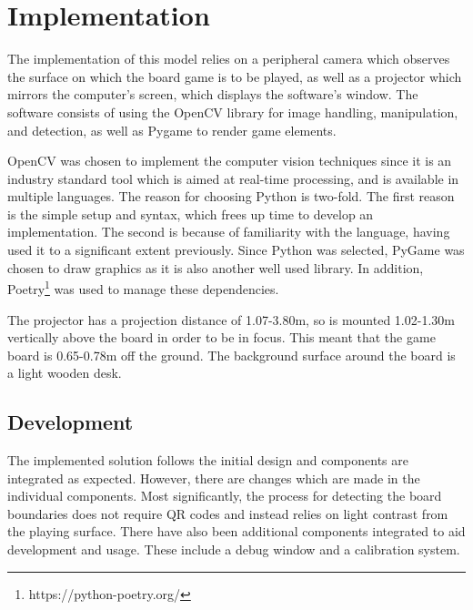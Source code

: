 \documentclass[12pt]{article}
\begin{document}





\section{Implementation}
The implementation of this model relies on a peripheral camera which observes the surface on which the board game is to be played, as well as a projector which mirrors the computer's screen, which displays the software's window. 
The software consists of using the OpenCV library for image handling, manipulation, and detection, as well as Pygame to render game elements. 

OpenCV was chosen to implement the computer vision techniques since it is an industry standard tool which is aimed at real-time processing, and is available in multiple languages. 
The reason for choosing Python is two-fold. 
The first reason is the simple setup and syntax, which frees up time to develop an implementation. 
The second is because of familiarity with the language, having used it to a significant extent previously. 
Since Python was selected, PyGame was chosen to draw graphics as it is also another well used library. 
In addition, Poetry\footnote{https://python-poetry.org/} was used to manage these dependencies. 

The projector has a projection distance of 1.07-3.80m, so is mounted 1.02-1.30m vertically above the board in order to be in focus. 
This meant that the game board is 0.65-0.78m off the ground. 
The background surface around the board is a light wooden desk. 

\subsection{Development}
The implemented solution follows the initial design and components are integrated as expected. 
However, there are changes which are made in the individual components. 
Most significantly, the process for detecting the board boundaries does not require QR codes and instead relies on light contrast from the playing surface. 
There have also been additional components integrated to aid development and usage. 
These include a debug window and a calibration system. 
\end{document}
